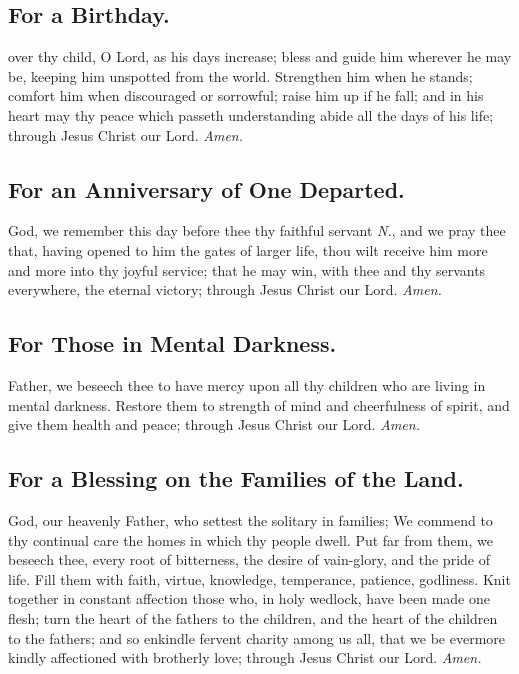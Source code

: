 \subsection{For a Birthday.}
 over thy child, O Lord, as his days increase; bless and guide him wherever he may be, keeping him unspotted from the world. Strengthen him when he stands; comfort him when discouraged or sorrowful; raise him up if he fall; and in his heart may thy peace which passeth understanding abide all the days of his life; through Jesus Christ our Lord. \textit{Amen.}

\subsection{For an Anniversary of One Departed.}
 God, we remember this day before thee thy faithful servant \textit{N.}, and we pray thee that, having opened to him the gates of larger life, thou wilt receive him more and more into thy joyful service; that he may win, with thee and thy servants everywhere, the eternal victory; through Jesus Christ our Lord. \textit{Amen.}

\subsection{For Those in Mental Darkness.}
 Father, we beseech thee to have mercy upon all thy children who are living in mental darkness. Restore them to strength of mind and cheerfulness of spirit, and give them health and peace; through Jesus Christ our Lord. \textit{Amen.}

\subsection{For a Blessing on the Families of the Land.}
 God, our heavenly Father, who settest the solitary in families; We commend to thy continual care the homes in which thy people dwell. Put far from them, we beseech thee, every root of bitterness, the desire of vain-glory, and the pride of life. Fill them with faith, virtue, knowledge, temperance, patience, godliness. Knit together in constant affection those who, in holy wedlock, have been made one flesh; turn the heart of the fathers to the children, and the heart of the children to the fathers; and so enkindle fervent charity among us all, that we be evermore kindly affectioned with brotherly love; through Jesus Christ our Lord. \textit{Amen.}


